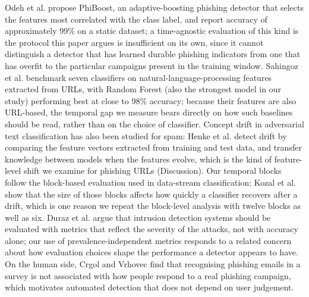 \documentclass[10pt, a4paper, oneside]{article}
\begin{document}
Odeh et al. \cite{odeh2021phiboost} propose PhiBoost, an adaptive-boosting phishing detector that selects the features most correlated with the class label, and report accuracy of approximately 99\% on a static dataset; a time-agnostic evaluation of this kind is the protocol this paper argues is insufficient on its own, since it cannot distinguish a detector that has learned durable phishing indicators from one that has overfit to the particular campaigns present in the training window. Sahingoz et al. \cite{sahingoz2019phishing} benchmark seven classifiers on natural-language-processing features extracted from URLs, with Random Forest (also the strongest model in our study) performing best at close to 98\% accuracy; because their features are also URL-based, the temporal gap we measure bears directly on how such baselines should be read, rather than on the choice of classifier. Concept drift in adversarial text classification has also been studied for spam: Henke et al. \cite{henke2021spam} detect drift by comparing the feature vectors extracted from training and test data, and transfer knowledge between models when the features evolve, which is the kind of feature-level shift we examine for phishing URLs (Discussion). Our temporal blocks follow the block-based evaluation used in data-stream classification; Kozal et al. \cite{kozal2022chunk} show that the size of those blocks affects how quickly a classifier recovers after a drift, which is one reason we repeat the block-level analysis with twelve blocks as well as six. Duraz et al. \cite{duraz2024cvss} argue that intrusion detection systems should be evaluated with metrics that reflect the severity of the attacks, not with accuracy alone; our use of prevalence-independent metrics responds to a related concern about how evaluation choices shape the performance a detector appears to have. On the human side, Crgol and Vrhovec \cite{crgol2024phishing} find that recognising phishing emails in a survey is not associated with how people respond to a real phishing campaign, which motivates automated detection that does not depend on user judgement.
\end{document}
